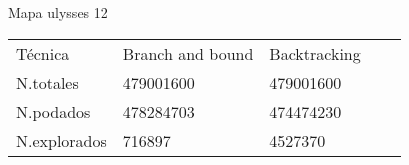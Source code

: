 	
	

	
						
		\begin{table}[H]
			Mapa ulysses 12
			\centering
			
			\label{my-label}
			\begin{tabular}{lllll}
				Técnica	& Branch and bound & Backtracking  &   \\
				N.totales& 479001600&479001600 &  &  \\
				N.podados&  478284703& 474474230&  &  \\
				N.explorados&716897  &4527370  &  &  \\
				
			\end{tabular}
		\end{table}
		

	


